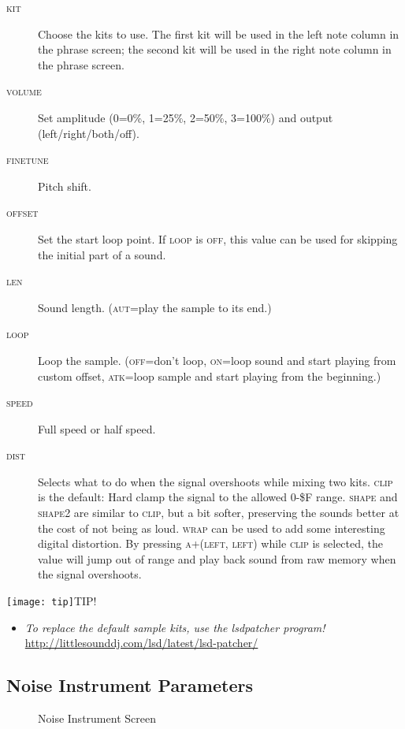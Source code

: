 \begin{description}
	\item[\textsc{kit}] Choose the kits to use. The first kit will be used in the left note column in the phrase screen; the second kit will be used in the right note column in the phrase screen.
    \item[\textsc{volume}] Set amplitude (0=0\%, 1=25\%, 2=50\%, 3=100\%) and output (left/right/both/off).
	\item[\textsc{finetune}] Pitch shift.
	\item[\textsc{offset}] Set the start loop point. If \textsc{loop} is \textsc{off}, this value can be used for skipping the initial part of a sound.
	\item[\textsc{len}] Sound length. (\textsc{aut}=play the sample to its end.)
	\item[\textsc{loop}] Loop the sample. (\textsc{off}=don't loop, \textsc{on}=loop sound and start playing from custom offset, \textsc{atk}=loop sample and start playing from the beginning.)
	\item[\textsc{speed}] Full speed or half speed.
	\item[\textsc{dist}] Selects what to do when the signal overshoots while mixing two kits. \textsc{clip} is the default: Hard clamp the signal to the allowed 0-\$F range. \textsc{shape} and \textsc{shape2} are similar to \textsc{clip}, but a bit softer, preserving the sounds better at the cost of not being as loud. \textsc{wrap} can be used to add some interesting digital distortion. By pressing \textsc{a+(left, left)} while \textsc{clip} is selected, the value will jump out of range and play back sound from raw memory when the signal overshoots.
\end{description}

\texttt{[image: tip]}TIP!
\begin{itemize}
\item \textit{To replace the default sample kits, use the lsdpatcher program!} \url{http://littlesounddj.com/lsd/latest/lsd-patcher/}
\end{itemize}

\subsection{Noise Instrument Parameters}
\label{noise-instrument-parameters}

\begin{figure}[htpb]
	\begin{center}
	\end{center}
	\caption{Noise Instrument Screen}
	\label{fig:instr-noise}
\end{figure}

